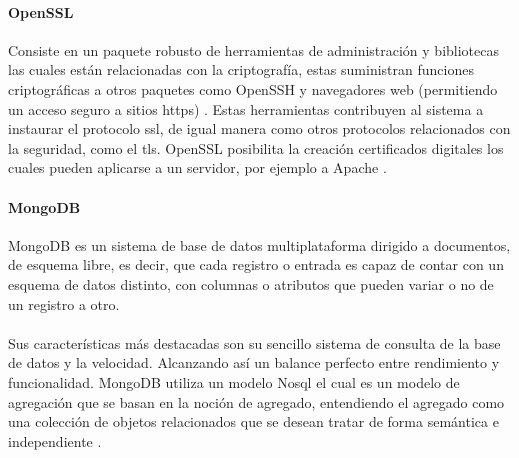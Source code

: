 \documentclass[12pt, a4paper, titlepage]{report}
\begin{document}
		   	\paragraph{OpenSSL\\}
		   	
		   	Consiste en un paquete robusto de herramientas de administración y bibliotecas las cuales están relacionadas con la criptografía, estas suministran funciones criptográficas a otros paquetes como OpenSSH y navegadores web (permitiendo un acceso seguro a sitios \acrshort{https}) \cite{refNodeOpenSSL}. Estas herramientas contribuyen al sistema a instaurar el protocolo \acrfull{ssl}, de igual manera como otros protocolos relacionados con la seguridad, como el \acrfull{tls}. OpenSSL posibilita la creación certificados digitales los cuales pueden aplicarse a un servidor, por ejemplo a Apache \cite{refopenssl}.
		   	
		   	\paragraph{MongoDB \\}
		   	MongoDB es un sistema de base de datos multiplataforma dirigido a documentos, de esquema libre, es decir, que cada registro o entrada es capaz de contar con un esquema de datos distinto, con columnas o atributos que pueden variar o no de un registro a otro.\\\\
		   	Sus características más destacadas son su sencillo sistema de consulta de la base de datos y la velocidad. Alcanzando así un balance perfecto entre rendimiento y funcionalidad. 
		   	MongoDB utiliza un modelo No\acrshort{sql} el cual es un modelo de agregación que se basan en la noción de agregado, entendiendo el agregado como una colección de objetos relacionados que se desean tratar de forma semántica e independiente \cite{refMongoDB}.
		   	
\end{document}
